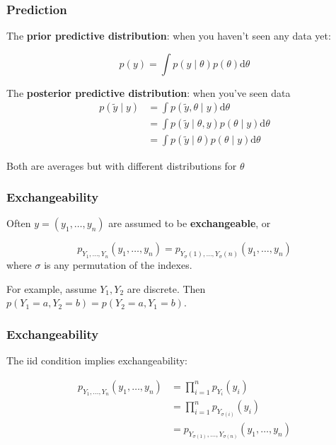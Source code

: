 \documentclass{beamer}
\begin{document}
\begin{frame}
\frametitle{Prediction}

The {\bf prior predictive distribution}: when you haven't seen any data yet:

\[
p(y) = \int p(y \mid \theta) p(\theta) \text{d}\theta
\]
\pause

The {\bf posterior predictive distribution}: when you've seen data 
\begin{align*}
p(\tilde{y} \mid y) &= \int p(\tilde{y}, \theta \mid y) \text{d}\theta \\
&= \int p(\tilde{y} \mid \theta, y) p(\theta \mid y) \text{d}\theta \\
&= \int p(\tilde{y} \mid \theta ) p(\theta \mid y) \text{d}\theta \tag{cond. indep.}
\end{align*}

Both are averages but with different distributions for $\theta$

\end{frame}


\begin{frame}
\frametitle{Exchangeability}

Often $y = (y_1, \ldots, y_n)$ are assumed to be {\bf exchangeable}, or

\[
p_{Y_1, \ldots, Y_n}(y_1, \ldots, y_n) = p_{Y_\sigma(1), \ldots, Y_\sigma(n)}(y_1, \ldots, y_n)
\]
where $\sigma$ is any permutation of the indexes.
\pause
\newline

For example, assume $Y_1, Y_2$ are discrete. Then $p(Y_1 = a, Y_2 = b) = p(Y_2 = a, Y_1=b)$.

\end{frame}


\begin{frame}
\frametitle{Exchangeability}

The iid condition implies exchangeability:

\begin{align*}
p_{Y_1, \ldots, Y_n}(y_1, \ldots, y_n) &= \prod_{i=1}^n p_{Y_i}(y_i) \tag{indep.} \\
&= \prod_{i=1}^n p_{Y_{\sigma(i)}}(y_i) \tag{ident.} \\
&= p_{Y_{\sigma(1)}, \ldots, Y_{\sigma(n)}}(y_1, \ldots, y_n)
\end{align*}

\end{frame}
\end{document}
